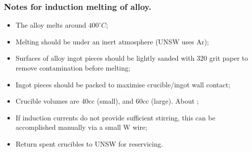 \subsubsection{Notes for induction melting of \MgZnCa alloy.}
\begin{itemize}
\item The \MgZnCa alloy melts around $400^{\circ}C$;
\item Melting should be under an inert atmosphere (UNSW uses Ar);
\item Surfaces of alloy ingot pieces should be lightly sanded with 320 grit paper to remove contamination before melting;
\item Ingot pieces should be packed to maximise crucible/ingot wall contact;
\item Crucible volumes are 40cc (small), and 60cc (large). About ;
\item If induction currents do not provide sufficient stirring, this can be accomplished manually via a small W wire; 
\item Return spent crucibles to UNSW for reservicing. 
\end{itemize}